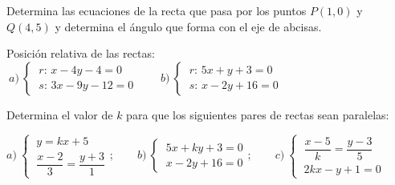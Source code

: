 \begin{mipropuesto}

Determina las ecuaciones de la recta que pasa por los puntos $P(1,0)$ y $Q(4,5)$ y determina el ángulo que forma con el eje de abcisas.

\end{mipropuesto}

\vspace{-8mm}
\begin{flushright}
\begin{footnotesize} \textcolor{gris}{}	\end{footnotesize}
\end{flushright}


\begin{mipropuesto}

Posición relativa de las rectas: $\ a) \ \begin{cases} \ r:\, x-4y-4=0 \\ \ s:\, 3x-9y-12=0 \end{cases} \qquad b)\ \begin{cases} \ r:\, 5x+y+3=0 \\ \ s:\, x-2y+16=0 \end{cases}$

\end{mipropuesto}

\vspace{-8mm}
\begin{flushright}
\begin{footnotesize} \textcolor{gris}{}	\end{footnotesize}
\end{flushright}

\begin{mipropuesto}

Determina el valor de $k$ para que los siguientes pares de rectas sean paralelas:

\vspace{2mm}$a) \ \begin{cases} \ y=kx+5 \\ \ \dfrac{x-2}{3}=\dfrac{y+3}{1} \end{cases} ;\qquad
b) \ \begin{cases}  \ 5x+ky+3=0\\ \ x-2y+16=0 \end{cases} ;\qquad
c) \ \begin{cases} \ \dfrac{x-5}{k}=\dfrac{y-3}{5} \\ \ 2kx-y+1=0  \end{cases}$

\end{mipropuesto}

